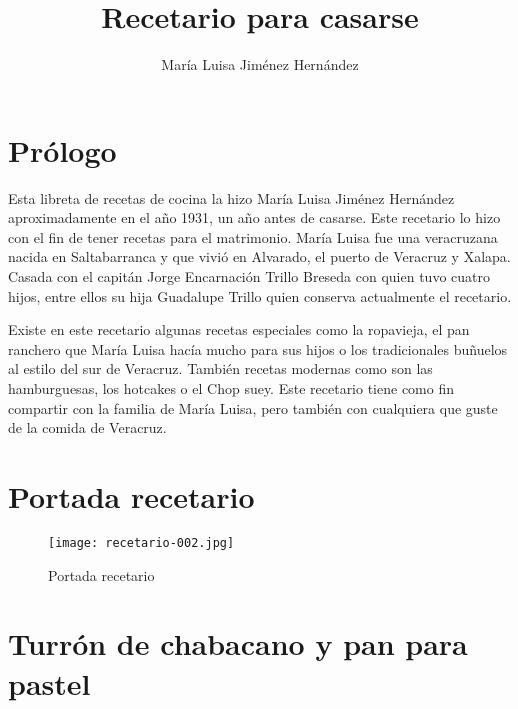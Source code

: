 \documentclass[12pt,letterpaper]{article}
\title{{\myfont Recetario para casarse}}
\author{{\Large María Luisa Jiménez Hernández}}
\begin{document}
\maketitle


\tableofcontents{}



\newpage
{}   %

\section{Prólogo}


Esta libreta de recetas de cocina la hizo María Luisa Jiménez Hernández aproximadamente en el año 1931, un año antes de casarse. Este recetario lo hizo con el fin de tener recetas para el matrimonio.
María Luisa fue una veracruzana nacida en Saltabarranca y que vivió en Alvarado, el puerto de Veracruz y Xalapa. Casada con el capitán Jorge Encarnación Trillo Breseda con quien tuvo cuatro hijos, entre ellos su hija Guadalupe Trillo quien conserva actualmente el recetario.

Existe en este recetario algunas recetas especiales como la ropavieja, el pan ranchero que María Luisa hacía mucho para sus hijos o los tradicionales buñuelos al estilo del sur de Veracruz. También recetas modernas como son las hamburguesas, los hotcakes o el Chop suey.
Este recetario tiene como fin compartir con la familia de María Luisa, pero también con cualquiera que guste de la comida de Veracruz.

\restoregeometry




\newpage

\section{Portada recetario}


\begin{figure}[H] 
  \vspace{2pt}
  \texttt{[image: recetario-002.jpg]}
    \caption{Portada recetario}
   
\end{figure}

\newpage

\section{Turrón de chabacano y pan para pastel}
\end{document}
